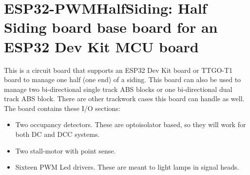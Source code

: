 %
%
%
%
% 
%
%
%
%
%
% 
%

\chapter{ESP32-PWMHalfSiding: Half Siding board base board for an ESP32 Dev Kit MCU board}

This is a circuit board that supports an ESP32 Dev Kit board or TTGO-T1 board 
to manage one half (one end) of a siding.  This board can also be used to 
manage two bi-directional single track ABS blocks or one bi-directional dual 
track ABS block.  There are other trackwork cases this board can handle as 
well.  The board contains these I/O sections:

\begin{itemize}
\item Two occupancy detectors.  These are optoisolator based, so they will 
work for both DC and DCC systems.
\item Two stall-motor with point sense.
\item Sixteen PWM Led drivers.  These are meant to light lamps in signal 
heads.
\end{itemize}

